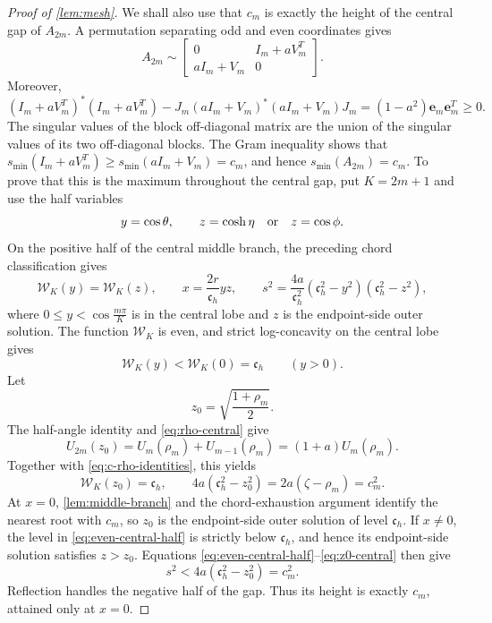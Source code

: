 \documentclass[review,hidelinks,onefignum,onetabnum]{siamart251216}
\begin{document}
\begin{proof}[Proof of \cref{lem:mesh}]
We shall also use that \(c_m\) is exactly the height of the central gap
of \(A_{2m}\).  A permutation separating odd and even coordinates gives
\[
 A_{2m}\sim
 \begin{bmatrix}0&I_m+aV_m^T\\aI_m+V_m&0\end{bmatrix}.
\]
Moreover,
\[
 (I_m+aV_m^T)^*(I_m+aV_m^T)
 -J_m(aI_m+V_m)^*(aI_m+V_m)J_m
 =(1-a^2)\mathbf e_m\mathbf e_m^T\geq0.
\]
The singular values of the block off-diagonal matrix are the union of
the singular values of its two off-diagonal blocks.  The Gram
inequality shows that
\(s_{\min}(I_m+aV_m^T)\geq s_{\min}(aI_m+V_m)=c_m\), and hence
\(s_{\min}(A_{2m})=c_m\).  To prove that this is the
maximum throughout the central gap, put \(K=2m+1\) and use the half
variables
\[
 y=\cos\theta,\qquad
 z=\cosh\eta\quad\hbox{or}\quad z=\cos\phi.
\]
On the positive half of the central middle branch, the preceding chord
classification gives
\begin{equation}\label{eq:even-central-half}
 \mathcal W_K(y)=\mathcal W_K(z),\qquad
 x=\frac{2r}{\mathfrak c_h}yz,\qquad
 s^2=\frac{4a}{\mathfrak c_h^2}
 (\mathfrak c_h^2-y^2)(\mathfrak c_h^2-z^2),
\end{equation}
where \(0\leq y<\cos\frac{m\pi}{K}\) is in the central lobe and
\(z\) is the
endpoint-side outer solution.  The function \(\mathcal W_K\) is even,
and strict log-concavity on the central lobe gives
\[
 \mathcal W_K(y)<\mathcal W_K(0)=\mathfrak c_h\qquad(y>0).
\]
Let
\[
 z_0=\sqrt{\frac{1+\rho_m}{2}}.
\]
The half-angle identity and \eqref{eq:rho-central} give
\[
 U_{2m}(z_0)=U_m(\rho_m)+U_{m-1}(\rho_m)
 =(1+a)U_m(\rho_m).
\]
Together with \eqref{eq:c-rho-identities}, this yields
\begin{equation}\label{eq:z0-central}
 \mathcal W_K(z_0)=\mathfrak c_h,\qquad
 4a(\mathfrak c_h^2-z_0^2)=2a(\zeta-\rho_m)=c_m^2.
\end{equation}
At \(x=0\), \cref{lem:middle-branch} and the chord-exhaustion argument
identify the nearest root with \(c_m\), so \(z_0\) is the endpoint-side
outer solution of level \(\mathfrak c_h\).  If \(x\neq0\), the level
in \eqref{eq:even-central-half} is strictly below \(\mathfrak c_h\), and hence its
endpoint-side solution satisfies \(z>z_0\).  Equations
\eqref{eq:even-central-half}--\eqref{eq:z0-central} then give
\[
 s^2<4a(\mathfrak c_h^2-z_0^2)=c_m^2.
\]
Reflection handles the negative half of the gap.  Thus its height is
exactly \(c_m\), attained only at \(x=0\).


\end{proof}
\end{document}
